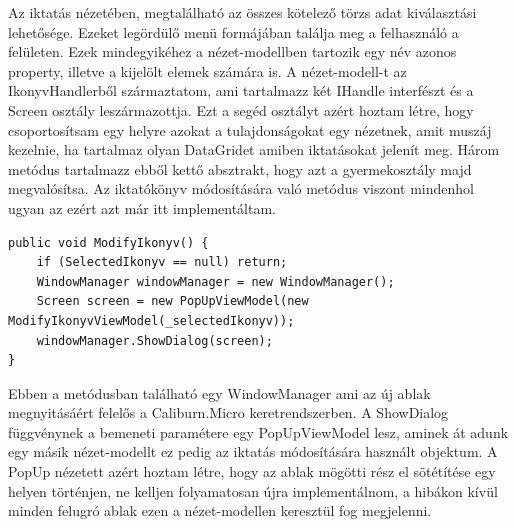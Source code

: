 \documentclass[
]{thesis-ekf}
\theoremstyle{definition}
\theoremstyle{remark}
\begin{document}
Az iktatás nézetében, megtalálható az összes kötelező törzs adat kiválasztási lehetősége. Ezeket legördülő menü formájában találja meg a felhasználó a felületen. Ezek mindegyikéhez a nézet-modellben tartozik egy név azonos property, illetve a kijelölt elemek számára is. A nézet-modell-t az IkonyvHandlerből származtatom, ami tartalmazz két IHandle interfészt és a Screen osztály leszármazottja. Ezt a segéd osztályt azért hoztam létre, hogy csoportosítsam egy helyre azokat a tulajdonságokat egy nézetnek, amit muszáj kezelnie, ha tartalmaz olyan DataGridet amiben iktatásokat jelenít meg. Három metódus tartalmazz ebből kettő absztrakt, hogy azt a gyermekosztály majd megvalósítsa. Az iktatókönyv módosítására való metódus viszont mindenhol ugyan az ezért azt már itt implementáltam. 
\begin{lstlisting}
public void ModifyIkonyv() {
	if (SelectedIkonyv == null) return;
	WindowManager windowManager = new WindowManager();
	Screen screen = new PopUpViewModel(new ModifyIkonyvViewModel(_selectedIkonyv));
	windowManager.ShowDialog(screen);	
}
\end{lstlisting}
Ebben a metódusban található egy WindowManager ami az új ablak megnyitásáért felelős a Caliburn.Micro keretrendszerben. A ShowDialog függvénynek a bemeneti paramétere egy PopUpViewModel lesz, aminek át adunk egy másik nézet-modellt ez pedig az iktatás módosítására használt objektum. A PopUp nézetett azért hoztam létre, hogy az ablak mögötti rész el sötétítése egy helyen történjen, ne kelljen folyamatosan újra implementálnom, a hibákon kívül minden felugró ablak ezen a nézet-modellen keresztül fog megjelenni. 
\end{document}
